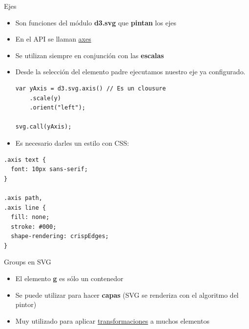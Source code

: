 \documentclass[ignorenonframetext,]{beamer}
\begin{document}
\begin{frame}[fragile]{Ejes}

\begin{itemize}
\item
  Son funciones del módulo \textbf{d3.svg} que \textbf{pintan} los ejes
\item
  En el API se llaman
  \href{https://github.com/mbostock/d3/wiki/SVG-Axes}{axes}
\item
  Se utilizan siempre en conjunción con las \textbf{escalas}
\item
  Desde la selección del elemento padre ejecutamos nuestro eje ya
  configurado.

\begin{lstlisting}
var yAxis = d3.svg.axis() // Es un clousure
    .scale(y)
    .orient("left");

svg.call(yAxis);
\end{lstlisting}
\end{itemize}

\end{frame}

\begin{frame}[fragile]

\begin{itemize}
\itemsep1pt\parskip0pt
\item
  Es necesario darles un estilo con CSS:
\end{itemize}

\begin{lstlisting}
.axis text {
  font: 10px sans-serif;
}

.axis path,
.axis line {
  fill: none;
  stroke: #000;
  shape-rendering: crispEdges;
}
\end{lstlisting}

\end{frame}

\begin{frame}{Groups en SVG}

\begin{itemize}
\item
  El elemento \textbf{g} es sólo un contenedor
\item
  Se puede utilizar para hacer \textbf{capas} (SVG se renderiza con el
  algoritmo del pintor)
\item
  Muy utilizado para aplicar
  \href{http://tutorials.jenkov.com/svg/svg-transformation.html}{transformaciones}
  a muchos elementos
\end{itemize}

\end{frame}
\end{document}

